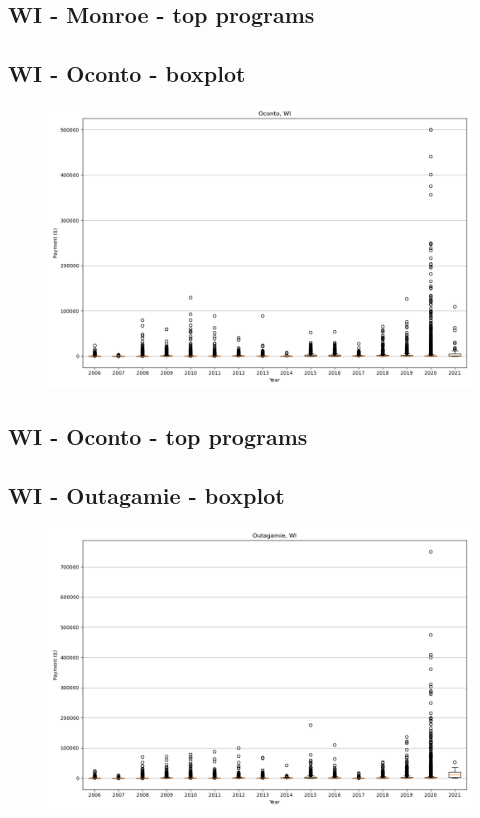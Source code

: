 \subsection*{WI - Monroe - top programs}

\newpage
\subsection*{WI - Oconto - boxplot}
\begin{figure}[h]
\centering
\includegraphics[width=7in]{../output/boxplots/counties/Oconto-WI_boxplot.png}
\end{figure}


\subsection*{WI - Oconto - top programs}

\newpage
\subsection*{WI - Outagamie - boxplot}
\begin{figure}[h]
\centering
\includegraphics[width=7in]{../output/boxplots/counties/Outagamie-WI_boxplot.png}
\end{figure}


